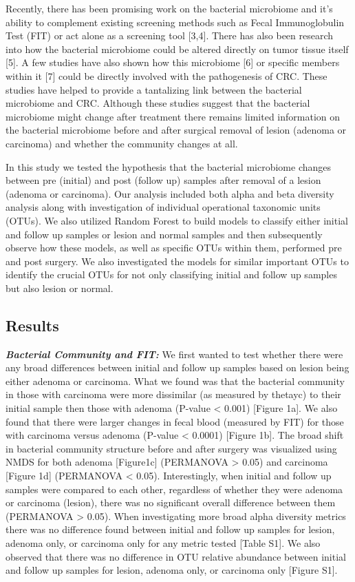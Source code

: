 \documentclass[12pt,]{article}
\begin{document}
Recently, there has been promising work on the bacterial microbiome and
it's ability to complement existing screening methods such as Fecal
Immunoglobulin Test (FIT) or act alone as a screening tool {[}3,4{]}.
There has also been research into how the bacterial microbiome could be
altered directly on tumor tissue itself {[}5{]}. A few studies have also
shown how this microbiome {[}6{]} or specific members within it {[}7{]}
could be directly involved with the pathogenesis of CRC. These studies
have helped to provide a tantalizing link between the bacterial
microbiome and CRC. Although these studies suggest that the bacterial
microbiome might change after treatment there remains limited
information on the bacterial microbiome before and after surgical
removal of lesion (adenoma or carcinoma) and whether the community
changes at all.

In this study we tested the hypothesis that the bacterial microbiome
changes between pre (initial) and post (follow up) samples after removal
of a lesion (adenoma or carcinoma). Our analysis included both alpha and
beta diversity analysis along with investigation of individual
operational taxonomic units (OTUs). We also utilized Random Forest to
build models to classify either initial and follow up samples or lesion
and normal samples and then subsequently observe how these models, as
well as specific OTUs within them, performed pre and post surgery. We
also investigated the models for similar important OTUs to identify the
crucial OTUs for not only classifying initial and follow up samples but
also lesion or normal.

\newpage

\subsection{Results}\label{results}

\textbf{\emph{Bacterial Community and FIT:}} We first wanted to test
whether there were any broad differences between initial and follow up
samples based on lesion being either adenoma or carcinoma. What we found
was that the bacterial community in those with carcinoma were more
dissimilar (as measured by thetayc) to their initial sample then those
with adenoma (P-value \textless{} 0.001) {[}Figure 1a{]}. We also found
that there were larger changes in fecal blood (measured by FIT) for
those with carcinoma versus adenoma (P-value \textless{} 0.0001)
{[}Figure 1b{]}. The broad shift in bacterial community structure before
and after surgery was visualized using NMDS for both adenoma
{[}Figure1c{]} (PERMANOVA \textgreater{} 0.05) and carcinoma {[}Figure
1d{]} (PERMANOVA \textless{} 0.05). Interestingly, when initial and
follow up samples were compared to each other, regardless of whether
they were adenoma or carcinoma (lesion), there was no significant
overall difference between them (PERMANOVA \textgreater{} 0.05). When
investigating more broad alpha diversity metrics there was no difference
found between initial and follow up samples for lesion, adenoma only, or
carcinoma only for any metric tested {[}Table S1{]}. We also observed
that there was no difference in OTU relative abundance between initial
and follow up samples for lesion, adenoma only, or carcinoma only
{[}Figure S1{]}.
\end{document}
